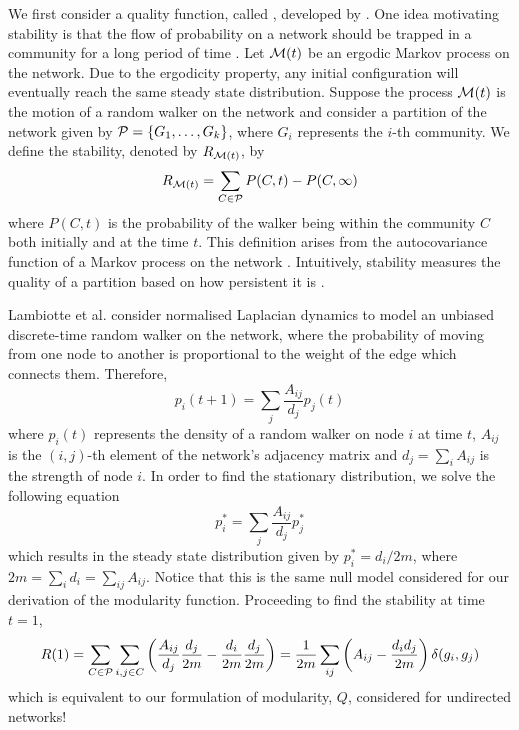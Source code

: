 We first consider a quality function, called , developed by \cite{LDB08}.
One idea motivating stability is that the flow of probability on a network should be trapped in a community for a long period of time \cite{Lam10}.
Let $\mathcal M(t)$ be an ergodic Markov process on the network.
Due to the ergodicity property, any initial configuration will eventually reach the same steady state distribution.
Suppose the process $\mathcal M(t)$ is the motion of a random walker on the network and consider a partition of the network given by $\mathcal P = \{ G_{1},\dots,G_{k} \}$, where $G_{i}$ represents the $i$-th community.
We define the stability, denoted by $R_{\mathcal M(t)}$, by
\begin{equation}
	\label{eq:stability}
	R_{\mathcal M(t)} = \sum_{C \in \mathcal P} P(C,t) - P(C,\infty)
\end{equation}
where $P(C,t)$ is the probability of the walker being within the community $C$ both initially and at the time $t$.
This definition arises from the autocovariance function of a Markov process on the network \cite{DYB08}.
Intuitively, stability measures the quality of a partition based on how persistent it is \cite{DYB08}.

Lambiotte et al. \cite{LDB08} consider normalised Laplacian dynamics to model an unbiased discrete-time random walker on the network, where the probability of moving from one node to another is proportional to the weight of the edge which connects them.
Therefore,
\begin{equation}
	\label{eq:densityRandomWalker}
	p_{i}(t+1) = \sum_{j} \frac{A_{ij}}{d_{j}} p_{j}(t)
\end{equation}
where $p_{i}(t)$ represents the density of a random walker on node $i$ at time $t$, $A_{ij}$ is the $(i,j)$-th element of the network's adjacency matrix and $d_{j} = \sum_{i} A_{ij}$ is the strength of node $i$.
In order to find the stationary distribution, we solve the following equation
\begin{equation}
	\label{eq:solveDensityRandomWalkerStationaryDistribution}
	p_{i}^{*} = \sum_{j} \frac{A_{ij}}{d_{j}} p_{j}^{*}
\end{equation}
which results in the steady state distribution given by $p_{i}^{*} = d_{i}/2m$, where $2m = \sum_{i} d_{i} = \sum_{ij} A_{ij}$.
Notice that this is the same null model considered for our derivation of the modularity function.
Proceeding to find the stability at time $t=1$,
\begin{equation}
	\label{eq:stabilityAtTime1}
	R(1) = \sum_{C \in \mathcal P} \sum_{i,j \in C} \left( \frac{A_{ij}}{d_{j}} \frac{d_{j}}{2m} - \frac{d_{i}}{2m} \frac{d_{j}}{2m} \right) = \frac{1}{2m} \sum_{ij} \left( A_{ij} - \frac{d_{i}d_{j}}{2m} \right) \delta(g_{i},g_{j})
\end{equation}
which is equivalent to our formulation of modularity, $Q$, considered for undirected networks!

